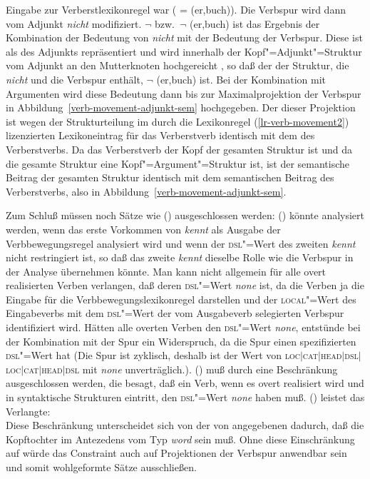 Eingabe zur Verberstlexikonregel war ( = (er,buch)). Die Verbspur wird dann vom
Adjunkt \emph{nicht} modifiziert. $\neg$  bzw.\ $\neg$ (er,buch) ist das Ergebnis der
Kombination der Bedeutung von \emph{nicht} mit der Bedeutung der Verbspur. Diese ist als \contw des
Adjunkts repräsentiert und wird innerhalb der Kopf"=Adjunkt"=Struktur vom Adjunkt an den Mutterknoten hochgereicht
, so daß der \contw der Struktur, die \emph{nicht} und die Verbspur enthält, $\neg$
(er,buch) ist. Bei der Kombination mit Argumenten wird diese Bedeutung dann bis zur Maximalprojektion
der Verbspur in Abbildung~\ref{verb-movement-adjunkt-sem} hochgegeben. Der \contw dieser Projektion
ist wegen der Strukturteilung im durch die Lexikonregel (\ref{lr-verb-movement2}) lizenzierten
Lexikoneintrag für das Verberstverb identisch mit dem \contw des Verberstverbs.  Da das Verberstverb
der Kopf der gesamten Struktur ist und da die gesamte Struktur eine Kopf"=Argument"=Struktur ist,
ist der semantische Beitrag der gesamten Struktur identisch mit dem semantischen Beitrag des
Verberstverbs, also  in Abbildung~\ref{verb-movement-adjunkt-sem}.

Zum Schluß müssen noch Sätze wie () ausgeschlossen werden:
\z
() könnte analysiert werden, wenn das erste Vorkommen von \emph{kennt} als Ausgabe der Verbbewegungsregel
analysiert wird und wenn der \textsc{dsl}"=Wert des zweiten \emph{kennt} nicht restringiert ist, so daß das
zweite \emph{kennt} dieselbe Rolle wie die Verbspur in der Analyse übernehmen könnte. Man kann nicht allgemein
für alle overt realisierten Verben verlangen, daß deren \textsc{dsl}"=Wert \emph{none} ist, da die Verben ja
die Eingabe für die Verbbewegungslexikonregel darstellen und der \textsc{local}"=Wert des Eingabeverbs mit dem
\textsc{dsl}"=Wert der vom Ausgabeverb selegierten Verbspur identifiziert wird. Hätten alle overten Verben
den \textsc{dsl}"=Wert \emph{none}, entstünde bei der Kombination mit der Spur ein Widerspruch, da die Spur einen
spezifizierten \textsc{dsl}"=Wert hat (Die Spur ist zyklisch, deshalb ist der Wert von \textsc{loc$|$cat$|$\-head$|$\-dsl$|$\-loc$|$\-cat$|$\-head$|$\-dsl}
mit \emph{none} unverträglich.).
() muß durch eine Beschränkung ausgeschlossen werden, die besagt, daß ein Verb, wenn es overt realisiert
wird und in syntaktische Strukturen eintritt, den \textsc{dsl}"=Wert \emph{none} haben muß. () leistet das
Verlangte:
\ea
{} \impl\\
\z
Diese Beschränkung unterscheidet sich von der von \citet[]{Meurers2000b} angegebenen \ua
dadurch, daß die Kopftochter im Antezedens vom Typ \emph{word} sein muß. Ohne diese
Einschränkung auf  würde das Constraint auch auf Projektionen der Verbspur anwendbar sein
und somit wohlgeformte Sätze ausschließen.

